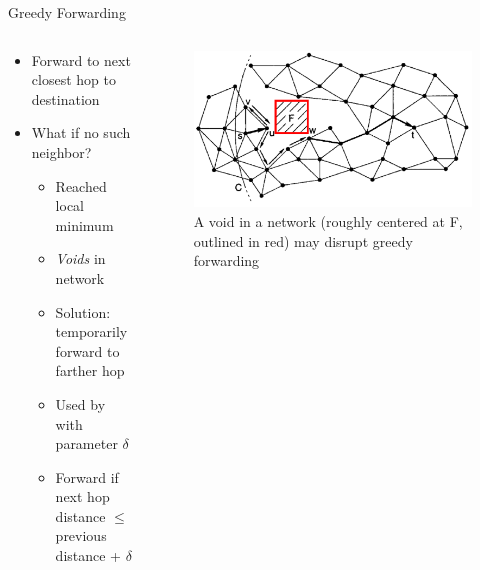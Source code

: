 \documentclass[pdftex]{beamer}
\begin{document}
\begin{frame}{Greedy Forwarding}
\begin{columns}
\begin{column}{.5\textwidth}
\begin{itemize}
	\item Forward to next closest hop to destination
	\item What if no such neighbor?
	\begin{itemize}
		\item Reached local minimum
		\item \emph{Voids} in network 
		\item Solution: temporarily forward to farther hop
		\item Used by \cite{Ko98location-aidedrouting, 749282} with parameter $\delta$
		\item Forward if next hop distance $\leq$ previous distance + $\delta$
	\end{itemize}
\end{itemize}
\end{column}

\begin{column}{.5\textwidth}
\begin{figure}
\includegraphics[width=\textwidth]{void}
\caption{A void in a network (roughly centered at F, outlined in red) may disrupt greedy forwarding}
\end{figure}
\end{column}
\end{columns}
\end{frame}
\end{document}
